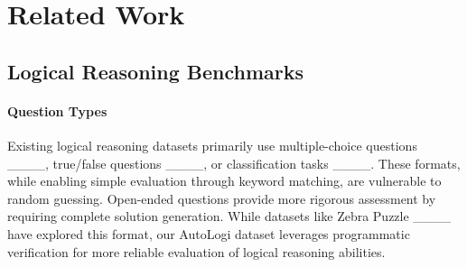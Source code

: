 \section{Related Work}
\subsection{Logical Reasoning Benchmarks}


\paragraph{Question Types}
Existing logical reasoning datasets primarily use multiple-choice questions ____, true/false questions ____, or classification tasks ____. These formats, while enabling simple evaluation through keyword matching, are vulnerable to random guessing. Open-ended questions provide more rigorous assessment by requiring complete solution generation. While datasets like Zebra Puzzle ____ have explored this format, our AutoLogi dataset leverages programmatic verification for more reliable evaluation of logical reasoning abilities.


